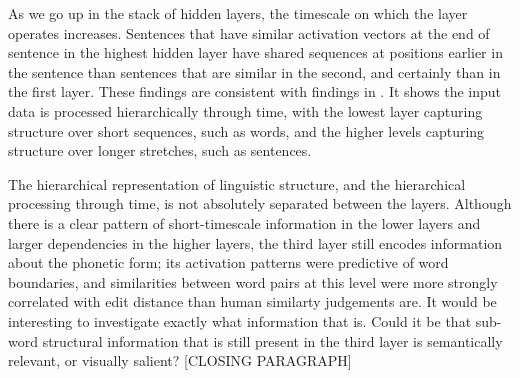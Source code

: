 As we go up in the stack of hidden layers, the timescale on which the layer operates increases. Sentences that have similar activation vectors at the end of sentence in the highest hidden layer have shared sequences at positions earlier in the sentence than sentences that are similar in the second, and certainly than in the first layer. These findings are consistent with findings in . It shows the input data is processed hierarchically through time, with the lowest layer capturing structure over short sequences, such as words, and the higher levels capturing structure over longer stretches, such as sentences. 

The hierarchical representation of linguistic structure, and the hierarchical processing through time, is not absolutely separated between the layers. Although there is a clear pattern of short-timescale information in the lower layers and larger dependencies in the higher layers, the third layer still encodes information about the phonetic form; its activation patterns were predictive of word boundaries, and similarities between word pairs at this level were more strongly correlated with edit distance than human similarty judgements are. It would be interesting to investigate exactly what information that is. Could it be that sub-word structural information that is still present in the third layer is semantically relevant, or visually salient? 
[CLOSING PARAGRAPH]